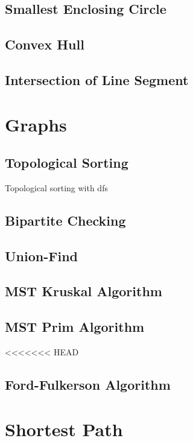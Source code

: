 \documentclass[landscape,8pt]{article}
\begin{document}
\begin{multicols}{2}
  \subsection{Smallest Enclosing Circle}

  \subsection{Convex Hull}

  \subsection{Intersection of Line Segment}

\columnbreak
\section{Graphs}
  \subsection{Topological Sorting}
  Topological sorting with dfs
    



  \subsection{Bipartite Checking}
    

  \subsection{Union-Find}
    
  \subsection{MST Kruskal Algorithm}
    

  \subsection{MST Prim Algorithm}
<<<<<<< HEAD
    
  \subsection{Ford-Fulkerson Algorithm}
\columnbreak

\section{Shortest Path}

\end{multicols}
\end{document}
